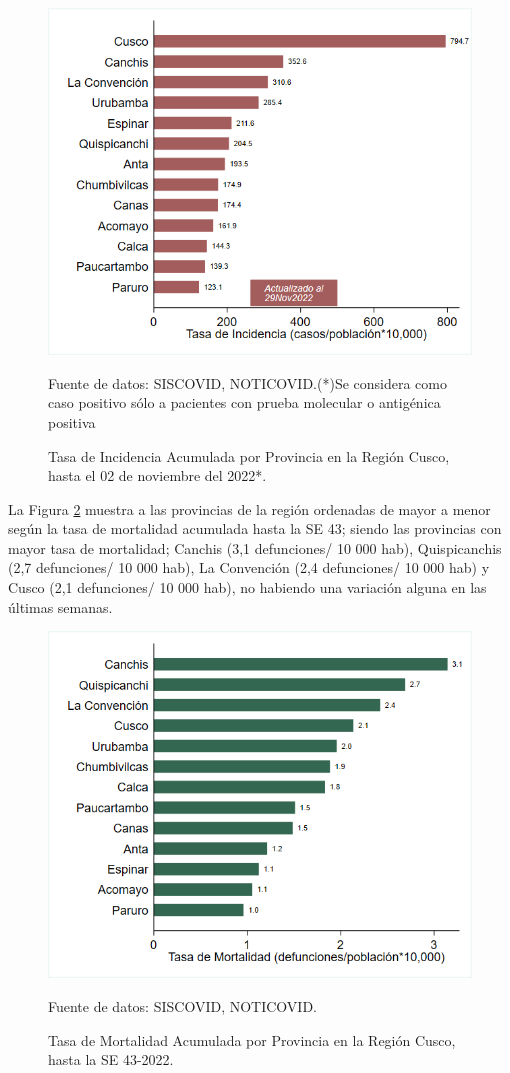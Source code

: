 \documentclass[12pt,a4paper,openany]{book}
\begin{document}
	\begin{figure}[!htpb]
		\caption{Tasa de Incidencia Acumulada por Provincia en la Región Cusco, hasta el 02 de noviembre del 2022*. }\label{fig:incidencia_provincias}
		\begin{center}
			\includegraphics[width=0.60\linewidth]{../figuras/incidencia_provincial_2022.png}
		\end{center}
		{\footnotesize {
				Fuente de datos: SISCOVID, NOTICOVID.(*)Se considera como caso positivo sólo a pacientes con prueba molecular o antigénica positiva}}
	\end{figure}
	
	La Figura \ref{fig:mortalidad_ordenada} muestra a las provincias de la región ordenadas de mayor a menor según la tasa de mortalidad acumulada hasta la SE 43; siendo las provincias con mayor tasa de mortalidad;  Canchis (3,1 defunciones/ 10 000 hab), Quispicanchis (2,7 defunciones/ 10 000 hab), La Convención (2,4 defunciones/ 10 000 hab) y Cusco (2,1 defunciones/ 10 000 hab), no habiendo una variación alguna en las últimas semanas.
	
	\begin{figure}[h]
		\caption{Tasa de Mortalidad Acumulada por Provincia en la Región Cusco, hasta la SE 43-2022. }\label{fig:mortalidad_ordenada}
		\begin{center}
			\includegraphics[width=0.60\linewidth]{../figuras/mortalidad_provincial_2022.png}
		\end{center}
		{\footnotesize {Fuente de datos: SISCOVID, NOTICOVID.}}
	\end{figure}
	
\end{document}

